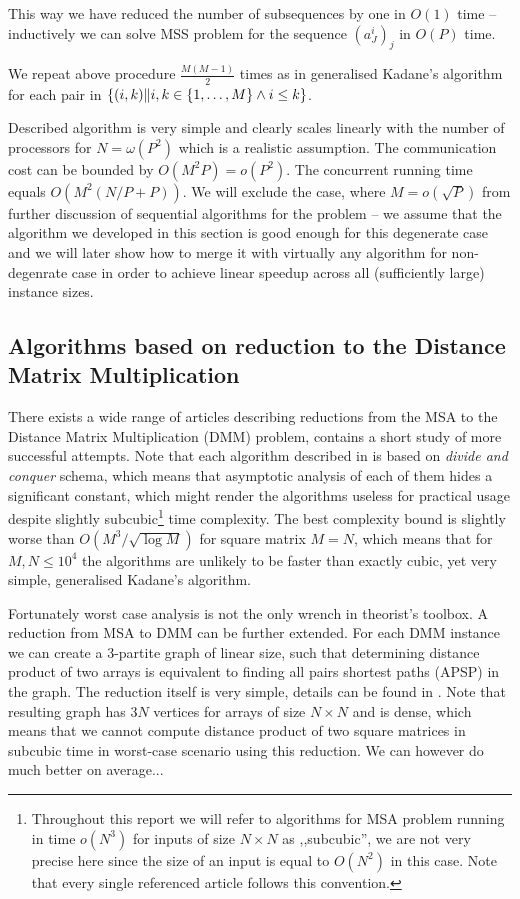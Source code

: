 This way we have reduced the number of subsequences by one in $O(1)$ time -- inductively we can solve MSS problem for the sequence $(a^i_J)_j$ in $O(P)$ time.

We repeat above procedure $\frac{M (M - 1)}{2}$ times as in generalised Kadane's algorithm for each pair in $\{ (i, k) \| i, k \in \{ 1, \dots, M \} \land i \leq k \}$.

Described algorithm is very simple and clearly scales linearly with the number of processors for $N = \omega(P^2)$ which is a realistic assumption.
The communication cost can be bounded by $O(M^2 P) = o(P^2)$.
The concurrent running time equals $O(M^2 (N / P + P))$.
We will exclude the case, where $M = o(\sqrt{P})$ from further discussion of sequential algorithms for the problem -- we assume that the algorithm we developed in this section is good enough for this degenerate case and we will later show how to merge it with virtually any algorithm for non-degenrate case in order to achieve linear speedup across all (sufficiently large) instance sizes.

\subsection*{Algorithms based on reduction to the Distance Matrix Multiplication}

There exists a wide range of articles describing reductions from the MSA to the Distance Matrix Multiplication (DMM) problem, \cite{TakaokaMSA} contains a short study of more successful attempts.
Note that each algorithm described in \cite{TakaokaMSA} is based on \emph{divide and conquer} schema, which means that asymptotic analysis of each of them hides a significant constant, which might render the algorithms useless for practical usage despite slightly subcubic\footnote{Throughout this report we will refer to algorithms for MSA problem running in time $o(N^3)$ for inputs of size $N \times N$ as ,,subcubic'', we are not very precise here since the size of an input is equal to $O(N^2)$ in this case. Note that every single referenced article follows this convention.} time complexity.
The best complexity bound is slightly worse than $O(M^3 / \sqrt{\log{M}})$ for square matrix $M = N$, which means that for $M, N \leq 10^4$ the algorithms are unlikely to be faster than exactly cubic, yet very simple, generalised Kadane's algorithm.

Fortunately worst case analysis is not the only wrench in theorist's toolbox.
A reduction from MSA to DMM can be further extended.
For each DMM instance we can create a $3$-partite graph of linear size, such that determining distance product of two arrays is equivalent to finding all pairs shortest paths (APSP) in the graph.
The reduction itself is very simple, details can be found in \cite{TakaokaMSA}.
Note that resulting graph has $3N$ vertices for arrays of size $N \times N$ and is dense, which means that we cannot compute distance product of two square matrices in subcubic time in worst-case scenario using this reduction.
We can however do much better on average...

